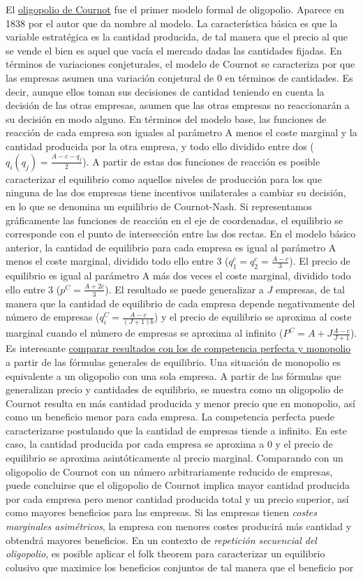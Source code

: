 \documentclass{nuevotema}
\begin{document}
El \underline{oligopolio de Cournot} fue el primer modelo formal de oligopolio. Aparece en 1838 por el autor que da nombre al modelo. La característica básica es que la variable estratégica es la cantidad producida, de tal manera que el precio al que se vende el bien es aquel que vacía el mercado dadas las cantidades fijadas. En términos de variaciones conjeturales, el modelo de Cournot se caracteriza por que las empresas asumen una variación conjetural de 0 en términos de cantidades. Es decir, aunque ellos toman sus decisiones de cantidad teniendo en cuenta la decisión de las otras empresas, asumen que las otras empresas no reaccionarán a su decisión en modo alguno. En términos del modelo base, las funciones de reacción de cada empresa son iguales al parámetro A menos el coste marginal y la cantidad producida por la otra empresa, y todo ello dividido entre dos ($q_i(q_j) = \frac{A-c-q_j}{2}$). A partir de estas dos funciones de reacción es posible caracterizar el equilibrio como aquellos niveles de producción para los que ninguna de las dos empresas tiene incentivos unilaterales a cambiar su decisión, en lo que se denomina un equilibrio de Cournot-Nash. Si representamos gráficamente las funciones de reacción en el eje de coordenadas, el equilibrio se corresponde con el punto de intersección entre las dos rectas. En el modelo básico anterior, la cantidad de equilibrio para cada empresa es igual al parámetro A menos el coste marginal, dividido todo ello entre 3 ($q_1^c = q_2^c = \frac{A-c}{3}$). El precio de equilibrio es igual al parámetro A más dos veces el coste marginal, dividido todo ello entre 3 ($p^C = \frac{A + 2c}{3}$). El resultado se puede generalizar a $J$ empresas, de tal manera que la cantidad de equilibrio de cada empresa depende negativamente del número de empresas ($q_i^C = \frac{A-c}{(J+1)b}$) y el precio de equilibrio se aproxima al coste marginal cuando el número de empresas se aproxima al infinito ($P^C = A+J \frac{A-c}{J+1}$). Es interesante \underline{comparar resultados con los de competencia perfecta y monopolio} a partir de las fórmulas generales de equilibrio. Una situación de monopolio es equivalente a un oligopolio con una sola empresa. A partir de las fórmulas que generalizan precio y cantidades de equilibrio, se muestra como un oligopolio de Cournot resulta en más cantidad producida y menor precio que en monopolio, así como un beneficio menor para cada empresa. La competencia perfecta puede caracterizarse postulando que la cantidad de empresas tiende a infinito. En este caso, la cantidad producida por cada empresa se aproxima a 0 y el precio de equilibrio se aproxima asintóticamente al precio marginal. Comparando con un oligopolio de Cournot con un número arbitrariamente reducido de empresas, puede concluirse que el oligopolio de Cournot implica mayor cantidad producida por cada empresa pero menor cantidad producida total y un precio superior, así como mayores beneficios para las empresas. Si las empresas tienen \textit{costes marginales asimétricos}, la empresa con menores costes producirá más cantidad y obtendrá mayores beneficios. En un contexto de \textit{repetición secuencial del oligopolio}, es posible aplicar el folk theorem para caracterizar un equilibrio colusivo que maximice los beneficios conjuntos de tal manera que el beneficio por 
\end{document}
